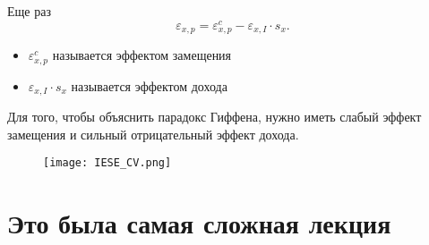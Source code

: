\documentclass{beamer}
\begin{document}
\begin{frame}
Еще раз
$$\varepsilon_{x,p} = \varepsilon^c_{x,p} - \varepsilon_{x,I} \cdot s_{x}.$$

\begin{itemize}
\item $\varepsilon^c_{x,p}$ называется эффектом замещения
\item $\varepsilon_{x,I} \cdot s_{x}$ называется эффектом дохода
\end{itemize}

Для того, чтобы объяснить парадокс Гиффена, нужно иметь слабый эффект замещения и сильный отрицательный эффект дохода.

\end{frame}

\begin{frame}
\begin{figure}[hbt]
\centering
\texttt{[image: IESE\_CV.png]}
\end{figure}

\end{frame}

\section{Это была самая сложная лекция}
\end{document}
